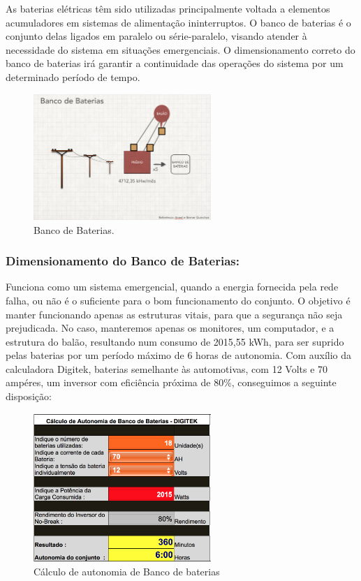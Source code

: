 As baterias elétricas têm sido utilizadas principalmente voltada a elementos acumuladores em sistemas de alimenta\c{c}ão ininterruptos. O banco de baterias é o conjunto delas ligados em paralelo ou série-paralelo, visando atender à necessidade do sistema em situações emergenciais. O dimensionamento correto do banco de baterias irá garantir a continuidade das operações do sistema por um determinado período de tempo.

\begin{figure}[H]
	\centering
	\includegraphics[width=0.6\textwidth]{figuras/baterias}
	\caption{Banco de Baterias.}
	\label{img:baterias}
\end{figure}

\subsubsection{Dimensionamento do Banco de Baterias:}

Funciona como um sistema emergencial, quando a energia fornecida pela rede falha, ou não é o suficiente para o bom funcionamento do conjunto. O objetivo é manter funcionando apenas as estruturas vitais, para que a segurança não seja prejudicada. No caso, manteremos apenas os monitores, um computador, e a estrutura do balão, resultando num consumo de 2015,55 kWh, para ser suprido pelas baterias por um período máximo de 6 horas de autonomia.
Com auxílio da calculadora Digitek, baterias semelhante às automotivas, com 12 Volts e 70 ampéres, um inversor com eficiência próxima de 80\%, conseguimos a seguinte disposição:

\begin{figure}[H]
	\centering
	\includegraphics[width=0.6\textwidth]{figuras/calculo}
	\caption[Cálculo de autonomia de Banco de baterias]{Cálculo de autonomia de Banco de baterias~\cite{digitek}}
	\label{img:calculo}
\end{figure}


